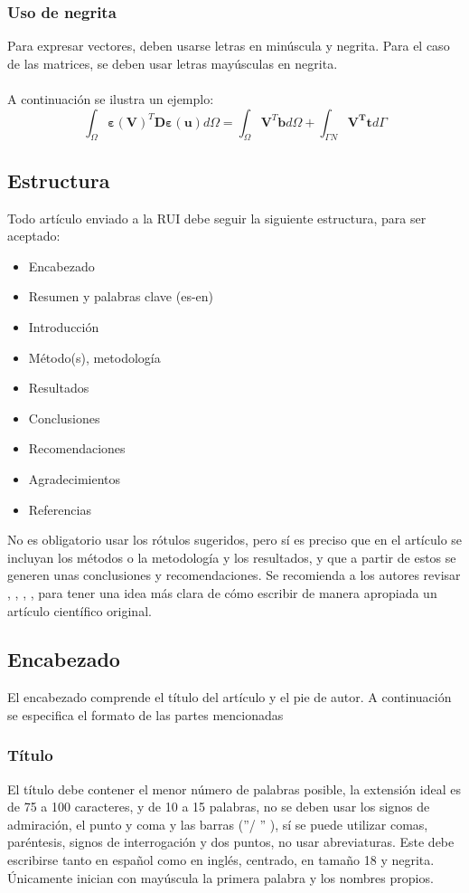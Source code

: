 \documentclass[10pt,letterpaper,twoside,twocolumn]{article}   %
\begin{document}
\subsubsection{Uso de negrita}
Para expresar vectores, deben usarse letras en minúscula y negrita. Para el caso de las matrices, se deben usar letras mayúsculas en negrita. \\
\\
A continuación se ilustra un ejemplo:
\begin{equation}
\int_{\Omega} \bm{\varepsilon} \left( \textbf{V} \right) ^{T} \textbf{D} \bm{\varepsilon} \left( \textbf{u} \right) d \Omega = \int_{\Omega} \textbf{V}^{T} \textbf{b} d \Omega + \int_{\Gamma N} \textbf{V}^{\textbf{T}}\textbf{t} d \Gamma
\end{equation}
\subsection{Estructura}
Todo artículo enviado a la RUI debe seguir la siguiente estructura, para ser aceptado:
\begin{itemize}
\item Encabezado
\item Resumen y palabras clave (es-en)
\item Introducción
\item Método(s), metodología
\item Resultados
\item Conclusiones
\item Recomendaciones
\item Agradecimientos
\item Referencias
\end{itemize}
No es obligatorio usar los rótulos sugeridos, pero sí es preciso que en el artículo se incluyan los métodos o la metodología y los resultados, y que a partir de estos se generen unas conclusiones y recomendaciones. Se recomienda a los autores revisar \cite{villagran2009algunas}, \cite{ferriols2005publicar}, \cite{henriquez2004elaboracion}, \cite{guillen1997estructura}, para tener una idea más clara de cómo escribir de manera apropiada un artículo científico original.
\subsection{Encabezado}
El encabezado comprende el título del artículo y el pie de autor. A continuación se especifica el formato de las partes mencionadas
\subsubsection{Título}
El título debe contener el menor número de palabras posible, la extensión ideal es de 75 a 100 caracteres, y de 10 a 15 palabras, no se deben usar los signos de admiración, el punto y coma y las barras (''/ '' ), sí se puede utilizar comas, paréntesis, signos de interrogación y dos puntos, no usar abreviaturas. Este debe escribirse tanto en español como en inglés, centrado, en tamaño 18 y negrita. Únicamente inician con mayúscula la primera palabra y los nombres propios.
\end{document}
